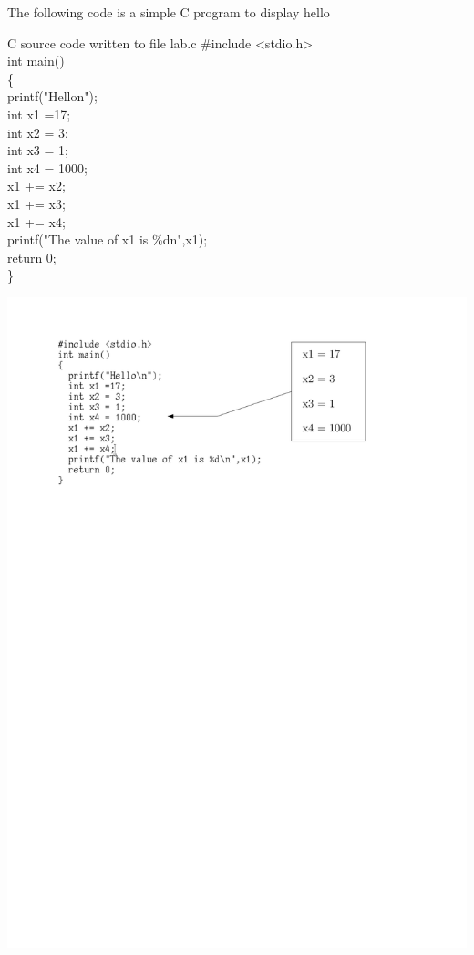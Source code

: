\documentclass{article}
\begin{document}
The following code is a simple C program to display hello
\begin{GFT}{C source code written to file lab.c}
\+\#include <stdio.h>\\
\+int main()\\
\+\{\\
\+  printf("Hello\Backslash{}n");\\
\+  int x1 =17;\\
\+  int x2 = 3;\\
\+  int x3 = 1;\\
\+  int x4 = 1000;\\
\+  x1 += x2;\\
\+  x1 += x3;\\
\+  x1 += x4;\\
\+  printf("The value of x1 is \%d\Backslash{}n",x1);\\
\+  return 0;\\
\+\}\\
\end{GFT}
\includegraphics{model1.pdf}  \\
\end{document}
